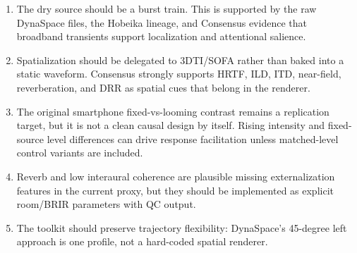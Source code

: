 \begin{enumerate}
  \item The dry source should be a burst train. This is supported by the raw DynaSpace files, the Hobeika lineage, and Consensus evidence that broadband transients support localization and attentional salience.
  \item Spatialization should be delegated to 3DTI/SOFA rather than baked into a static waveform. Consensus strongly supports HRTF, ILD, ITD, near-field, reverberation, and DRR as spatial cues that belong in the renderer.
  \item The original smartphone fixed-vs-looming contrast remains a replication target, but it is not a clean causal design by itself. Rising intensity and fixed-source level differences can drive response facilitation unless matched-level control variants are included.
  \item Reverb and low interaural coherence are plausible missing externalization features in the current proxy, but they should be implemented as explicit room/BRIR parameters with QC output.
  \item The toolkit should preserve trajectory flexibility: DynaSpace's 45-degree left approach is one profile, not a hard-coded spatial renderer.
\end{enumerate}

